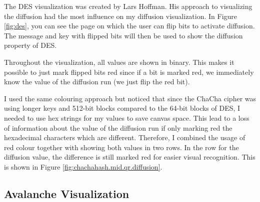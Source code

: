 The DES visualization was created by Lars Hoffman. His approach to visualizing the diffusion had the most influence on my diffusion visualization. In Figure \ref{fig:des}, you can see the page on which the user can flip bits to activate diffusion. The message and key with flipped bits will then be used to show the diffusion property of DES. 

Throughout the visualization, all values are shown in binary. This makes it possible to just mark flipped bits red since if a bit is marked red, we immediately know the value of the diffusion run (we just flip the red bit). 

I used the same colouring approach but noticed that since the ChaCha cipher was using longer keys and 512-bit blocks compared to the 64-bit blocks of DES, I needed to use hex strings for my values to save canvas space. This lead to a loss of information about the value of the diffusion run if only marking red the hexadecimal characters which are different. Therefore, I combined the usage of red colour together with showing both values in two rows. In the row for the diffusion value, the difference is still marked red for easier visual recognition. This is shown in Figure \ref{fig:chachahash.mid.qr.diffusion}.

\subsection{Avalanche Visualization}
\label{sec:avalancheVisualization}

